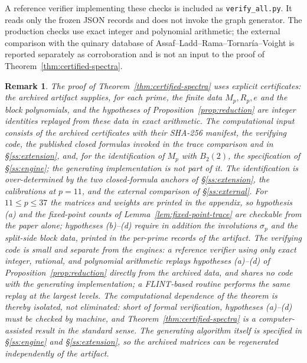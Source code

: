 \documentclass[10pt,a4paper]{amsart}
\newtheorem{remark}[theorem]{Remark}
\begin{document}
	A reference verifier implementing these checks is included as
	\texttt{verify\_all.py}. It reads only the frozen JSON
	records and does not invoke the graph generator. The production checks use
	exact integer and polynomial arithmetic; the external comparison with the
	quinary database of Assaf--Ladd--Rama--Tornar\'ia--Voight is reported
	separately as corroboration and is not an input to the proof of
	Theorem~\ref{thm:certified-spectra}.
	
	\begin{remark}\label{rem:trustedbase}
		The proof of Theorem~\ref{thm:certified-spectra} uses explicit certificates: the archived artifact supplies,
		for each prime, the finite data $M_p,R_p,e$ and the block polynomials, and the hypotheses of Proposition~\ref{prop:reduction} are integer identities replayed from these data in exact
		arithmetic. The computational input consists of the archived certificates with their
		SHA-256 manifest, the verifying code, the published closed formulas invoked in the
		trace comparison and in \S\ref{ss:extension}, and, for the identification of $M_p$ with $B_2(2)$,
		the specification of \S\ref{ss:engine}; the generating implementation is not part of it.
		The identification is over-determined by the two closed-formula anchors of \S\ref{ss:extension},
		the calibrations 	at $p=11$, and the external comparison of \S\ref{ss:external}.
		For 	$11\le p\le37$ the matrices and weights are printed in the appendix,
		so hypothesis \textup{(a)} and the fixed-point counts of Lemma~\ref{lem:fixed-point-trace} are
		checkable from the paper alone; 	hypotheses \textup{(b)}--\textup{(d)} require in addition the
		involutions $\sigma_p$ and the split-side block data, printed in the
		per-prime records of the artifact. The verifying code is small
		and separate from the engines: a reference verifier using only exact
		integer, rational, and polynomial arithmetic replays hypotheses
		\textup{(a)}--\textup{(d)} of Proposition~\ref{prop:reduction} directly
		from the archived data, and shares no code with the generating
		implementation; a FLINT-based routine performs the same replay at the
		largest levels. The computational dependence of the theorem is thereby
		isolated, not eliminated: short of formal verification, hypotheses
		\textup{(a)}--\textup{(d)} must be checked by machine, and
		Theorem~\ref{thm:certified-spectra} is a computer-assisted result in the
		standard sense. The generating algorithm itself is specified in
		\S\ref{ss:engine} and \S\ref{ss:extension}, so the archived matrices can
		be regenerated independently of the artifact.
	\end{remark}
	
\end{document}
